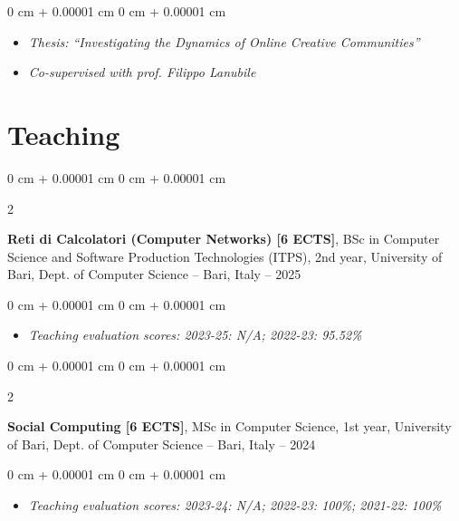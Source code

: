 \documentclass[10pt, a4paper]{article}
\newenvironment{highlights}{
    \begin{itemize}[
        topsep=0.10 cm,
        parsep=0.10 cm,
        partopsep=0pt,
        itemsep=0pt,
        leftmargin=0 cm + 10pt
    ]
}{
    \end{itemize}
} %
\newenvironment{onecolentry}{
    \begin{adjustwidth}{
        0 cm + 0.00001 cm
    }{
        0 cm + 0.00001 cm
    }
}{
    \end{adjustwidth}
} %
\newenvironment{twocolentry}[2][]{
    \onecolentry
    \def\secondColumn{#2}
    \setcolumnwidth{\fill, 4.5 cm}
    \begin{paracol}{2}
}{
    \switchcolumn \raggedleft \secondColumn
    \end{paracol}
    \endonecolentry
} %
\begin{document}
        \vspace{0.10 cm}
        \begin{onecolentry}
            \begin{highlights}
                \item \textit{Thesis: ``Investigating the Dynamics of Online Creative Communities''}
                \item \textit{Co-supervised with prof. Filippo Lanubile}
            \end{highlights}
        \end{onecolentry}



    
    \section{Teaching}



        
        \begin{twocolentry}{
            2022 – 2025
        }
            \textbf{Reti di Calcolatori (Computer Networks) [6 ECTS]}, BSc in Computer Science and Software Production Technologies (ITPS), 2nd year, University of Bari, Dept. of Computer Science -- Bari, Italy\end{twocolentry}

        \vspace{0.10 cm}
        \begin{onecolentry}
            \begin{highlights}
                \item \textit{Teaching evaluation scores:  2023-25: N/A; 2022-23: 95.52\%}
            \end{highlights}
        \end{onecolentry}


        \vspace{0.2 cm}

        \begin{twocolentry}{
            2021 – 2024
        }
            \textbf{Social Computing [6 ECTS]}, MSc in Computer Science, 1st year, University of Bari, Dept. of Computer Science -- Bari, Italy\end{twocolentry}

        \vspace{0.10 cm}
        \begin{onecolentry}
            \begin{highlights}
                \item \textit{Teaching evaluation scores: 2023-24: N/A; 2022-23: 100\%; 2021-22: 100\%}
            \end{highlights}
        \end{onecolentry}
\end{document}
